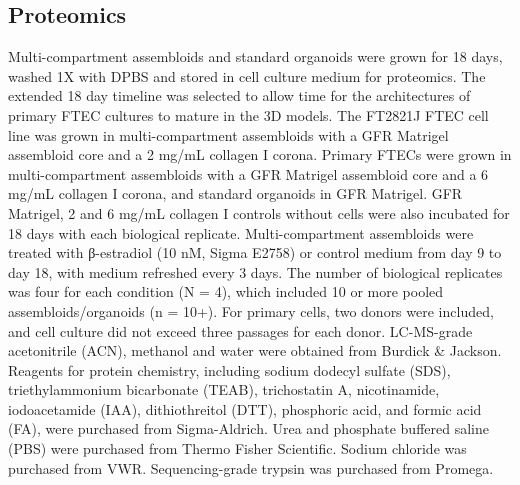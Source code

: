 \begin{refsection}
    \subsection{Proteomics}
    Multi-compartment assembloids and standard organoids were grown for 18 days, washed 1X with DPBS and stored in cell culture medium for proteomics. The extended 18 day timeline was selected to allow time for the architectures of primary FTEC cultures to mature in the 3D models. The FT2821J FTEC cell line was grown in multi-compartment assembloids with a GFR Matrigel assembloid core and a 2 mg/mL collagen I corona. Primary FTECs were grown in multi-compartment assembloids with a GFR Matrigel assembloid core and a 6 mg/mL collagen I corona, and standard organoids in GFR Matrigel. GFR Matrigel, 2 and 6 mg/mL collagen I controls without cells were also incubated for 18 days with each biological replicate. Multi-compartment assembloids were treated with β-estradiol\cite{garcia-alonso2021a} (10 nM, Sigma E2758) or control medium from day 9 to day 18, with medium refreshed every 3 days.  The number of biological replicates was four for each condition (N = 4), which included 10 or more pooled assembloids/organoids (n = 10+).  For primary cells, two donors were included, and cell culture did not exceed three passages for each donor.
    LC-MS-grade acetonitrile (ACN), methanol and water were obtained from Burdick \& Jackson. Reagents for protein chemistry, including sodium dodecyl sulfate (SDS), triethylammonium bicarbonate (TEAB), trichostatin A, nicotinamide, iodoacetamide (IAA), dithiothreitol (DTT), phosphoric acid, and formic acid (FA), were purchased from Sigma-Aldrich. Urea and phosphate buffered saline (PBS) were purchased from Thermo Fisher Scientific. Sodium chloride was purchased from VWR. Sequencing-grade trypsin was purchased from Promega.
    

\end{refsection}
